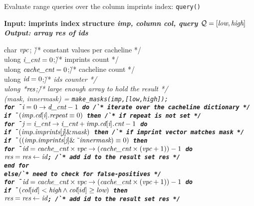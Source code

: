 \begin{algorithm}[t]
\caption{Evaluate range queries over the column imprints index:
\tt{query()}}
\label{alg:select}
\small{
\bf{Input:}  imprints index structure \it{imp}, column \it{col},
query $\mathcal{Q}=[\it{low},\it{high}]$\\
\bf{Output:} array \it{res} of \it{id}s
\begin{tabbing}
char $\it{vpc}$; \` /* constant values per cacheline */\\
ulong $\it{i\_cnt}=0$;\` /* imprints count */\\
ulong $\it{cache\_cnt}=0$;\` /* cacheline count */\\
ulong $\it{id}=0$;\` /* \it{id}s counter */\\
ulong $\it{*res}$;\` /* large enough array to hold the result */\\
(\it{mask}, \it{innermask}) = \tt{make\_masks}(\it{imp},[\it{low},\it{high}]);\\
\bf{for}\=\ $\it{i}=0\rightarrow \it{d\_cnt}-1$ \bf{do}
\` /* iterate over the cacheline dictionary */\\
\>\bf{if}\=\ $(\it{imp.cd}[\it{i}]\it{.repeat}\equiv 0)$ \bf{then}
\` /* if \it{repeat} is not set */\\
\>\> \bf{for}\=\ $\it{j}=\it{i\_cnt}\rightarrow \it{i\_cnt}+
\it{imp.cd}[\it{i}]\it{.cnt}-1$ \bf{do}\\
\>\>\>\bf{if}\=\ $(\it{imp.imprints}[\it{j}]\& \it{mask})$ \bf{then}
\` /* if imprint vector matches mask */\\
\>\>\>\>\bf{if}\=\ $((\it{imp.imprints}[\it{j}]\&\ \tilde{\ }\it{innermask})
\equiv 0)$ \bf{then}\\
\>\>\>\>\>\bf{for}\=\ $\it{id}=\it{cache\_cnt}\times\it{vpc}\rightarrow
(\it{cache\_cnt}\times(\it{vpc}+1))-1$ \bf{do}\\
\>\>\>\>\>\>$\it{res}=\it{res}\leftarrow\it{id}$;
\` /* add \it{id} to the result set \it{res} */\\
\>\>\>\>\>\bf{end for}\\
\>\>\>\>\bf{else}\` /* need to check for false-positives */\\
\>\>\>\>\>\bf{for}\=\ $\it{id}=\it{cache\_cnt}\times\it{vpc}\rightarrow
(\it{cache\_cnt}\times(\it{vpc}+1))-1$ \bf{do}\\
\>\>\>\>\>\>\bf{if}\=\ $(\it{col}[id]<\it{high}\wedge\it{col}[id]
\geq\it{low})$ \bf{then}\\
\>\>\>\>\>\>\>$\it{res}=\it{res}\leftarrow\it{id}$;
\` /* add \it{id} to the result set \it{res} */\\

\end{tabbing}}
\end{algorithm}
